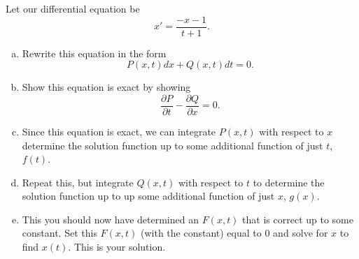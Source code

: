 \documentclass[12pt]{report} %
\theoremstyle{definition}
\begin{document}
Let our differential equation be
\[
x' = \frac{-x-1}{t+1}.
\]
\begin{enumerate}[(a)]
\item Rewrite this equation in the form
\[
P(x,t)dx + Q(x,t)dt = 0.
\]
\item Show this equation is exact by showing
\[
\frac{\partial P}{\partial t} -  \frac{\partial Q}{\partial x} = 0.
\]
\item Since this equation is exact, we can integrate $P(x,t)$ with respect to $x$ determine the solution function up to some additional function of just $t$, $f(t)$.

\item Repeat this, but integrate $Q(x,t)$ with respect to $t$ to determine the solution function up to up some additional function of just $x$, $g(x)$.
\item This you should now have determined an $F(x,t)$ that is correct up to some constant.  Set this $F(x,t)$ (with the constant) equal to $0$ and solve for $x$ to find $x(t)$.  This is your solution.
\end{enumerate}
\end{document}
